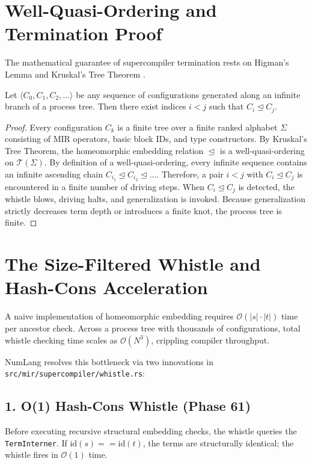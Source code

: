 \section{Well-Quasi-Ordering and Termination Proof}
\label{sec:termination:kruskal_proof}

The mathematical guarantee of supercompiler termination rests on Higman's Lemma and Kruskal's Tree Theorem \citep{kruskal1960well}.

\begin{theorem}
Let $\langle C_0, C_1, C_2, \dots \rangle$ be any sequence of configurations generated along an infinite branch of a process tree. Then there exist indices $i < j$ such that $C_i \trianglelefteq C_j$.
\end{theorem}

\begin{proof}
Every configuration $C_k$ is a finite tree over a finite ranked alphabet $\Sigma$ consisting of MIR operators, basic block IDs, and type constructors. By Kruskal's Tree Theorem, the homeomorphic embedding relation $\trianglelefteq$ is a well-quasi-ordering on $\mathcal{T}(\Sigma)$. By definition of a well-quasi-ordering, every infinite sequence contains an infinite ascending chain $C_{i_1} \trianglelefteq C_{i_2} \trianglelefteq \dots$. Therefore, a pair $i < j$ with $C_i \trianglelefteq C_j$ is encountered in a finite number of driving steps. When $C_i \trianglelefteq C_j$ is detected, the whistle blows, driving halts, and generalization is invoked. Because generalization strictly decreases term depth or introduces a finite knot, the process tree is finite.
\end{proof}

\section{The Size-Filtered Whistle and Hash-Cons Acceleration}
\label{sec:termination:size_filtered}

A naive implementation of homeomorphic embedding requires $\mathcal{O}(|s| \cdot |t|)$ time per ancestor check. Across a process tree with thousands of configurations, total whistle checking time scales as $\mathcal{O}(N^3)$, crippling compiler throughput.

NumLang resolves this bottleneck via two innovations in \texttt{src/mir/supercompiler/whistle.rs}:

\subsection{1. O(1) Hash-Cons Whistle (Phase 61)}
Before executing recursive structural embedding checks, the whistle queries the \texttt{TermInterner}. If $\text{id}(s) == \text{id}(t)$, the terms are structurally identical; the whistle fires in $\mathcal{O}(1)$ time.

